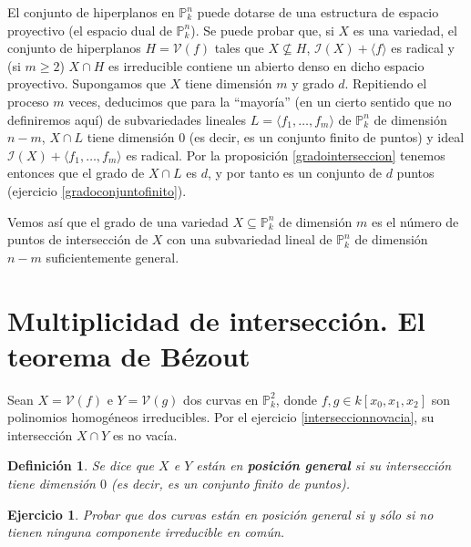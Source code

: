 \documentclass[a4paper,10pt]{book}
\newtheorem{defn}[thm]{Definición}
\newtheorem{ejercicio}{Ejercicio}[chapter]
\newcommand{\PP}{\mathbb P}
\newcommand{\Pnk}{\PP^n_k}
\newcommand{\II}{{\mathcal I}}
\newcommand{\VV}{{\mathcal V}}
\begin{document}
El conjunto de hiperplanos en $\Pnk$ puede dotarse de una estructura de espacio proyectivo (el espacio dual de $\Pnk$). Se puede probar que, si $X$ es una variedad, el conjunto de hiperplanos $H=\VV(f)$ tales que $X\not\subseteq H$, $\II(X)+\langle f\rangle$ es radical y (si $m\geq 2$) $X\cap H$ es irreducible contiene un abierto denso en dicho espacio proyectivo. Supongamos que $X$ tiene dimensión $m$ y grado $d$. Repitiendo el proceso $m$ veces, deducimos que para la ``mayoría'' (en un cierto sentido que no definiremos aquí) de subvariedades lineales $L=\langle f_1,\ldots,f_m\rangle$ de $\Pnk$ de dimensión $n-m$, $X\cap L$ tiene dimensión $0$ (es decir, es un conjunto finito de puntos) y ideal $\II(X)+\langle f_1,\ldots,f_m\rangle$ es radical. Por la proposición \ref{gradointerseccion} tenemos entonces que el grado de $X\cap L$ es $d$, y por tanto es un conjunto de $d$ puntos (ejercicio \ref{gradoconjuntofinito}).

Vemos así que el grado de una variedad $X\subseteq\Pnk$ de dimensión $m$ es el número de puntos de intersección de $X$ con una subvariedad lineal de $\Pnk$ de dimensión $n-m$ suficientemente general. 

\section[Multiplicidad de intersección]{Multiplicidad de intersección. El teorema de Bézout}

                                                                                                                                                                                                                                                                                                                                                                                        Sean $X=\VV(f)$ e $Y=\VV(g)$ dos curvas en $\PP^2_k$, donde $f,g\in k[x_0,x_1,x_2]$ son polinomios homogéneos irreducibles. Por el ejercicio \ref{interseccionnovacia}, su intersección $X\cap Y$ es no vacía. 

\begin{defn}
 Se dice que $X$ e $Y$ están en {\bf posición general} si su intersección tiene dimensión $0$ (es decir, es un conjunto finito de puntos).
\end{defn}

\begin{ejercicio}
 Probar que dos curvas están en posición general si y sólo si no tienen ninguna componente irreducible en común.
\end{ejercicio}
\end{document}
